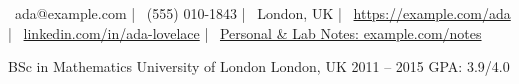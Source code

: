 \documentclass[]{awesome-cv}
\begin{document}
\begin{center}
  \\
 \\
\vspace{2mm}
{\faEnvelope\ ada@example.com} | {\faMobile\ (555) 010-1843} | {\faMapMarker\ London, UK} | {\faLink\ \href{https://example.com/ada}{https://example.\allowbreak{}com/\allowbreak{}ada}} | {\faLink\ \href{https://linkedin.com/in/ada-lovelace}{linkedin.\allowbreak{}com/\allowbreak{}in/\allowbreak{}ada-\allowbreak{}lovelace}} | {\faLink\ \href{https://example.com/notes}{Personal \& Lab Notes: example.\allowbreak{}com/\allowbreak{}notes}}
\\ \vspace{6.0mm} 
\end{center}
    \vspace{3pt}
    \begin{cventries}
    \cventry
{BSc in Mathematics}
{University of London}
{London, UK}
{2011 – 2015}
{GPA: 3.9/4.0}
    \end{cventries}
\end{document}
